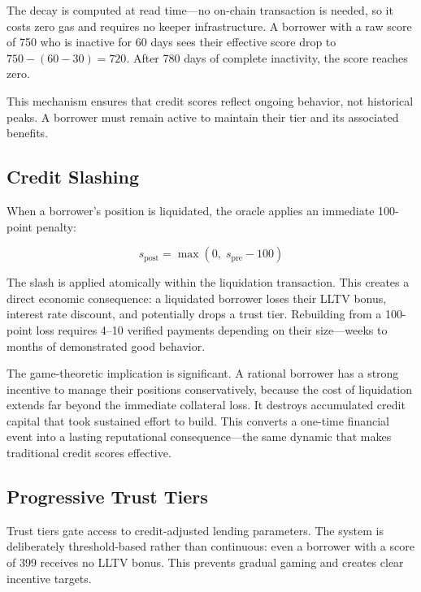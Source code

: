 \documentclass[11pt,a4paper]{article}
\begin{document}
The decay is computed at read time---no on-chain transaction is needed, so it costs zero gas and requires no keeper infrastructure. A borrower with a raw score of 750 who is inactive for 60 days sees their effective score drop to $750 - (60 - 30) = 720$. After 780 days of complete inactivity, the score reaches zero.

This mechanism ensures that credit scores reflect ongoing behavior, not historical peaks. A borrower must remain active to maintain their tier and its associated benefits.

\subsection{Credit Slashing}

When a borrower's position is liquidated, the oracle applies an immediate 100-point penalty:

\begin{equation}
s_{\text{post}} = \max(0,\; s_{\text{pre}} - 100)
\end{equation}

The slash is applied atomically within the liquidation transaction. This creates a direct economic consequence: a liquidated borrower loses their LLTV bonus, interest rate discount, and potentially drops a trust tier. Rebuilding from a 100-point loss requires 4--10 verified payments depending on their size---weeks to months of demonstrated good behavior.

The game-theoretic implication is significant. A rational borrower has a strong incentive to manage their positions conservatively, because the cost of liquidation extends far beyond the immediate collateral loss. It destroys accumulated credit capital that took sustained effort to build. This converts a one-time financial event into a lasting reputational consequence---the same dynamic that makes traditional credit scores effective.

\subsection{Progressive Trust Tiers}

Trust tiers gate access to credit-adjusted lending parameters. The system is deliberately threshold-based rather than continuous: even a borrower with a score of 399 receives no LLTV bonus. This prevents gradual gaming and creates clear incentive targets.
\end{document}
